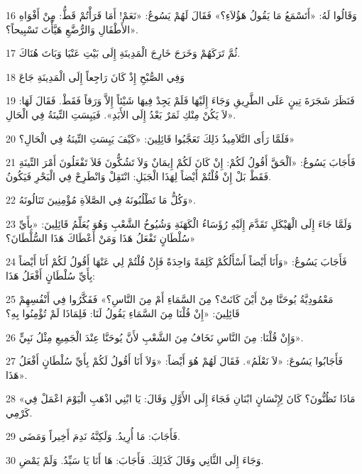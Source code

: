 \par 16 وَقَالُوا لَهُ: «أَتَسْمَعُ مَا يَقُولُ هَؤُلاَءِ؟» فَقَالَ لَهُمْ يَسُوعُ: «نَعَمْ! أَمَا قَرَأْتُمْ قَطُّ: مِنْ أَفْوَاهِ الأَطْفَالِ وَالرُّضَّعِ هَيَّأْتَ تَسْبِيحاً؟».
\par 17 ثُمَّ تَرَكَهُمْ وَخَرَجَ خَارِجَ الْمَدِينَةِ إِلَى بَيْتِ عَنْيَا وَبَاتَ هُنَاكَ.
\par 18 وَفِي الصُّبْحِ إِذْ كَانَ رَاجِعاً إِلَى الْمَدِينَةِ جَاعَ
\par 19 فَنَظَرَ شَجَرَةَ تِينٍ عَلَى الطَّرِيقِ وَجَاءَ إِلَيْهَا فَلَمْ يَجِدْ فِيهَا شَيْئاً إِلاَّ وَرَقاً فَقَطْ. فَقَالَ لَهَا: «لاَ يَكُنْ مِنْكِ ثَمَرٌ بَعْدُ إِلَى الأَبَدِ». فَيَبِسَتِ التِّينَةُ فِي الْحَالِ.
\par 20 فَلَمَّا رَأَى التَّلاَمِيذُ ذَلِكَ تَعَجَّبُوا قَائِلِينَ: «كَيْفَ يَبِسَتِ التِّينَةُ فِي الْحَالِ؟»
\par 21 فَأَجَابَ يَسُوعُ: «اَلْحَقَّ أَقُولُ لَكُمْ: إِنْ كَانَ لَكُمْ إِيمَانٌ وَلاَ تَشُكُّونَ فَلاَ تَفْعَلُونَ أَمْرَ التِّينَةِ فَقَطْ بَلْ إِنْ قُلْتُمْ أَيْضاً لِهَذَا الْجَبَلِ: انْتَقِلْ وَانْطَرِحْ فِي الْبَحْرِ فَيَكُونُ.
\par 22 وَكُلُّ مَا تَطْلُبُونَهُ فِي الصَّلاَةِ مُؤْمِنِينَ تَنَالُونَهُ».
\par 23 وَلَمَّا جَاءَ إِلَى الْهَيْكَلِ تَقَدَّمَ إِلَيْهِ رُؤَسَاءُ الْكَهَنَةِ وَشُيُوخُ الشَّعْبِ وَهُوَ يُعَلِّمُ قَائِلِينَ: «بِأَيِّ سُلْطَانٍ تَفْعَلُ هَذَا وَمَنْ أَعْطَاكَ هَذَا السُّلْطَانَ؟»
\par 24 فَأَجَابَ يَسُوعُ: «وَأَنَا أَيْضاً أَسْأَلُكُمْ كَلِمَةً وَاحِدَةً فَإِنْ قُلْتُمْ لِي عَنْهَا أَقُولُ لَكُمْ أَنَا أَيْضاً بِأَيِّ سُلْطَانٍ أَفْعَلُ هَذَا:
\par 25 مَعْمُودِيَّةُ يُوحَنَّا مِنْ أَيْنَ كَانَتْ؟ مِنَ السَّمَاءِ أَمْ مِنَ النَّاسِ؟» فَفَكَّرُوا فِي أَنْفُسِهِمْ قَائِلِينَ: «إِنْ قُلْنَا مِنَ السَّمَاءِ يَقُولُ لَنَا: فَلِمَاذَا لَمْ تُؤْمِنُوا بِهِ؟
\par 26 وَإِنْ قُلْنَا: مِنَ النَّاسِ نَخَافُ مِنَ الشَّعْبِ لأَنَّ يُوحَنَّا عِنْدَ الْجَمِيعِ مِثْلُ نَبِيٍّ».
\par 27 فَأَجَابُوا يَسُوعَ: «لاَ نَعْلَمُ». فَقَالَ لَهُمْ هُوَ أَيْضاً: «وَلاَ أَنَا أَقُولُ لَكُمْ بِأَيِّ سُلْطَانٍ أَفْعَلُ هَذَا».
\par 28 «مَاذَا تَظُنُّونَ؟ كَانَ لِإِنْسَانٍ ابْنَانِ فَجَاءَ إِلَى الأَوَّلِ وَقَالَ: يَا ابْنِي اذْهَبِ الْيَوْمَ اعْمَلْ فِي كَرْمِي.
\par 29 فَأَجَابَ: مَا أُرِيدُ. وَلَكِنَّهُ نَدِمَ أَخِيراً وَمَضَى.
\par 30 وَجَاءَ إِلَى الثَّانِي وَقَالَ كَذَلِكَ. فَأَجَابَ: هَا أَنَا يَا سَيِّدُ. وَلَمْ يَمْضِ.
